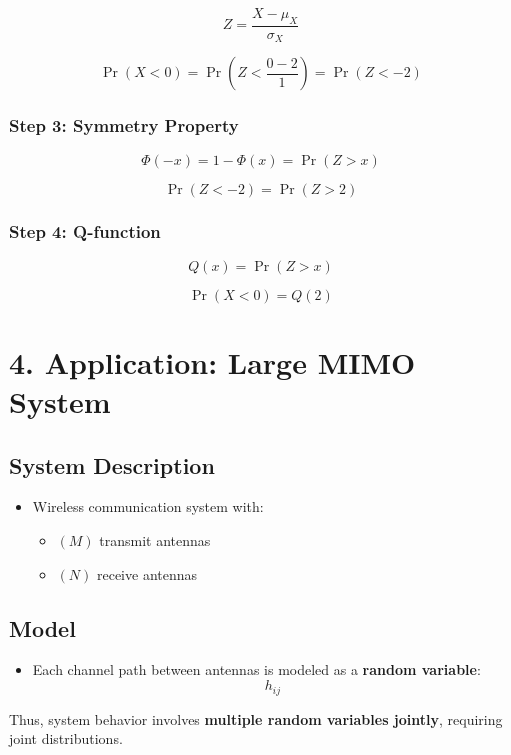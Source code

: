 \documentclass[12pt]{article}
\begin{document}
\[
Z = \frac{X - \mu_X}{\sigma_X}
\]

\[
\Pr(X < 0) = \Pr\left(Z < \frac{0 - 2}{1}\right)
= \Pr(Z < -2)
\]

\subsubsection*{Step 3: Symmetry Property}

\[
\Phi(-x) = 1 - \Phi(x) = \Pr(Z > x)
\]

\[
\Pr(Z < -2) = \Pr(Z > 2)
\]

\subsubsection*{Step 4: Q-function}

\[
Q(x) = \Pr(Z > x)
\]

\[
\boxed{\Pr(X < 0) = Q(2)}
\]

\section*{4. Application: Large MIMO System}

\subsection*{System Description}

\begin{itemize}
    \item Wireless communication system with:
    \begin{itemize}
        \item $(M)$ transmit antennas
        \item $(N)$ receive antennas
    \end{itemize}
\end{itemize}

\subsection*{Model}

\begin{itemize}
    \item Each channel path between antennas is modeled as a \textbf{random variable}:
    \[
    h_{ij}
    \]
\end{itemize}

Thus, system behavior involves \textbf{multiple random variables jointly}, requiring joint distributions.
\end{document}
